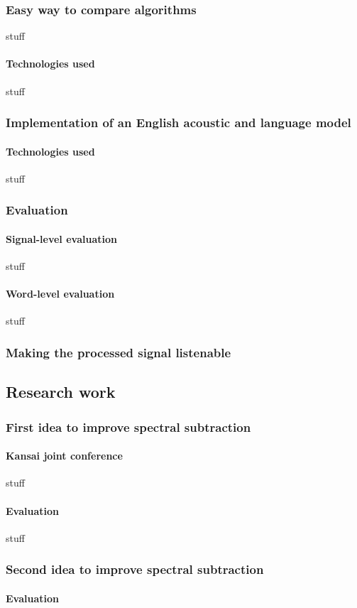 \subsubsection{Easy way to compare algorithms}
stuff
\paragraph{Technologies used}
stuff
\subsubsection{Implementation of an English acoustic and language model}
\paragraph{Technologies used}
stuff
\subsubsection{Evaluation}
\paragraph{Signal-level evaluation}
stuff
\paragraph{Word-level evaluation}
stuff
\subsubsection{Making the processed signal listenable}
\subsection{Research work}
\subsubsection{First idea to improve spectral subtraction}
\paragraph{Kansai joint conference}
stuff
\paragraph{Evaluation}
stuff
\subsubsection{Second idea to improve spectral subtraction}
\paragraph{Evaluation}